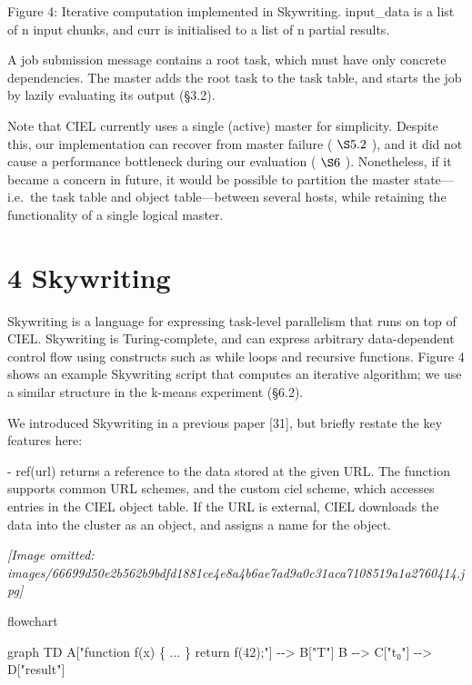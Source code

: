 \documentclass[
]{article}
\newenvironment{Shaded}{}{}
\newcommand{\NormalTok}[1]{#1}
\begin{document}
Figure 4: Iterative computation implemented in Skywriting. input\_data
is a list of n input chunks, and curr is initialised to a list of n
partial results.

A job submission message contains a root task, which must have only
concrete dependencies. The master adds the root task to the task table,
and starts the job by lazily evaluating its output (§3.2).

Note that CIEL currently uses a single (active) master for simplicity.
Despite this, our implementation can recover from master failure (
\(\S5.2\) ), and it did not cause a performance bottleneck during our
evaluation ( \(\S6\) ). Nonetheless, if it became a concern in future,
it would be possible to partition the master state---i.e.~the task table
and object table---between several hosts, while retaining the
functionality of a single logical master.

\section{4 Skywriting}\label{skywriting}

Skywriting is a language for expressing task-level parallelism that runs
on top of CIEL. Skywriting is Turing-complete, and can express arbitrary
data-dependent control flow using constructs such as while loops and
recursive functions. Figure 4 shows an example Skywriting script that
computes an iterative algorithm; we use a similar structure in the
k-means experiment (§6.2).

We introduced Skywriting in a previous paper {[}31{]}, but briefly
restate the key features here:

- ref(url) returns a reference to the data stored at the given URL. The
function supports common URL schemes, and the custom ciel scheme, which
accesses entries in the CIEL object table. If the URL is external, CIEL
downloads the data into the cluster as an object, and assigns a name for
the object.

\textit{[Image omitted: images/66699d50e2b562b9bdfd1881ce4e8a4b6ae7ad9a0c31aca7108519a1a2760414.jpg]}

flowchart

\begin{Shaded}
\begin{Highlighting}[]
\NormalTok{graph TD}
\NormalTok{    A["function f(x) \{ ... \} return f(42);"] {-}{-}\textgreater{} B["T"]}
\NormalTok{    B {-}{-}\textgreater{} C["t₀"] {-}{-}\textgreater{} D["result"]}
\end{Highlighting}
\end{Shaded}
\end{document}
